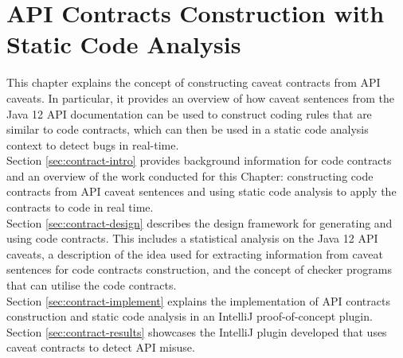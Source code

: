 \chapter{API Contracts Construction with Static Code Analysis}
\label{cha:codeAnalysis}
This chapter explains the concept of constructing caveat contracts from API caveats. In particular, it provides an overview of how caveat sentences from the Java 12 API documentation can be used to construct coding rules that are similar to code contracts, which can then be used in a static code analysis context to detect bugs in real-time.\\

\noindent
Section \ref{sec:contract-intro} provides background information for code contracts and an overview of the work conducted for this Chapter: constructing code contracts from API caveat sentences and using static code analysis to apply the contracts to code in real time. \\

\noindent
Section \ref{sec:contract-design} describes the design framework for generating and using code contracts. This includes a statistical analysis on the Java 12 API caveats, a description of the idea used for extracting information from caveat sentences for code contracts construction, and the concept of checker programs that can utilise the code contracts. \\

\noindent
Section \ref{sec:contract-implement} explains the implementation of API contracts construction and static code analysis in an IntelliJ proof-of-concept plugin. \\

\noindent
Section \ref{sec:contract-results} showcases the IntelliJ plugin developed that uses caveat contracts to detect API misuse. 

